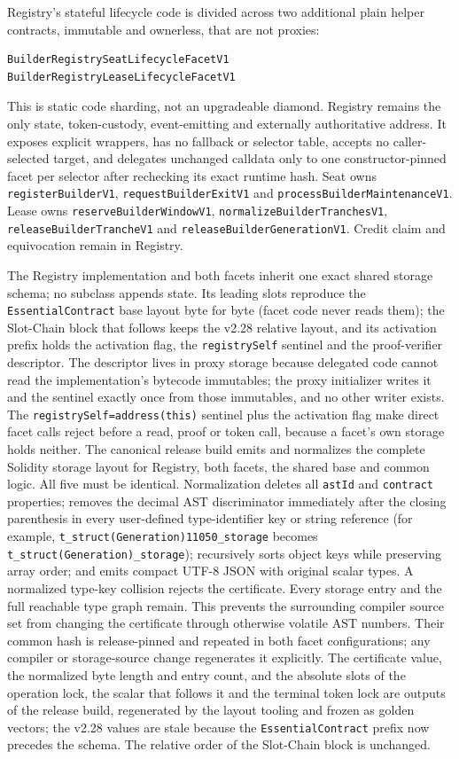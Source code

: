 \documentclass[a4paper,11pt]{article}
\newcommand{\code}[1]{\nolinkurl{#1}}
\begin{document}
Registry's stateful lifecycle code is divided across two additional plain
helper contracts, immutable and ownerless, that are not proxies:
\begin{verbatim}
BuilderRegistrySeatLifecycleFacetV1
BuilderRegistryLeaseLifecycleFacetV1
\end{verbatim}
This is static code sharding,
not an upgradeable diamond.  Registry remains the only state, token-custody,
event-emitting and externally authoritative address.  It exposes explicit
wrappers, has no fallback or selector table, accepts no caller-selected target,
and delegates unchanged calldata only to one constructor-pinned facet per
selector after rechecking its exact runtime hash.  Seat owns
\code{registerBuilderV1}, \code{requestBuilderExitV1} and
\code{processBuilderMaintenanceV1}.  Lease owns
\code{reserveBuilderWindowV1}, \code{normalizeBuilderTranchesV1},
\code{releaseBuilderTrancheV1} and \code{releaseBuilderGenerationV1}.
Credit claim and equivocation remain in Registry.

The Registry implementation and both facets inherit one exact shared storage
schema; no subclass appends state.  Its leading slots reproduce the
\code{EssentialContract} base layout byte for byte (facet code never reads
them); the Slot-Chain block that follows keeps the v2.28 relative layout, and
its activation prefix holds the activation flag, the \code{registrySelf}
sentinel and the proof-verifier descriptor.  The descriptor lives in proxy
storage because delegated code cannot read the implementation's bytecode
immutables; the proxy initializer writes it and the sentinel exactly once from
those immutables, and no other writer exists.  The
\code{registrySelf=address(this)} sentinel plus the activation flag make direct
facet calls reject before a read, proof or token call, because a facet's own
storage holds neither.  The
canonical release build emits and normalizes the complete Solidity storage
layout for Registry, both facets, the shared base and common logic.  All five
must be identical.  Normalization deletes all \code{astId} and
\code{contract} properties; removes the decimal AST discriminator immediately
after the closing parenthesis in every user-defined type-identifier key or
string reference (for example,
\code{t\_struct(Generation)11050\_storage} becomes
\code{t\_struct(Generation)\_storage}); recursively sorts object keys while
preserving array order; and emits compact UTF-8 JSON with original scalar
types.  A normalized type-key collision rejects the certificate.  Every
storage entry and the full reachable type graph remain.  This
prevents the surrounding compiler source set from changing the certificate
through otherwise volatile AST numbers.  Their common hash is release-pinned
and repeated in both facet configurations; any compiler or storage-source
change regenerates it explicitly.  The certificate value, the normalized byte
length and entry count, and the absolute slots of the operation lock, the
scalar that follows it and the terminal token lock are outputs of the release
build, regenerated by the layout tooling and frozen as golden vectors; the
v2.28 values are stale because the \code{EssentialContract} prefix now
precedes the schema.  The relative order of the Slot-Chain block is unchanged.
\end{document}
